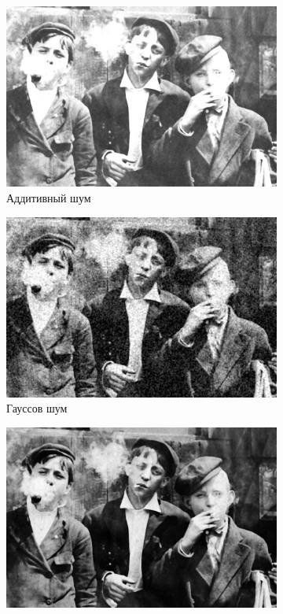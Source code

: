 \begin{figure}[ht!]
\begin{subfigure}[b]{0.5\linewidth}
      \includegraphics[width=0.95\linewidth]{../Rang_Filter/Rang_Additive_noise_(k=5,r=14).jpg} 
      \caption{Аддитивный шум} 
      \label{rang_5_14:c} 
      \vspace{4ex}
    \end{subfigure}%
    \begin{subfigure}[b]{0.5\linewidth}
      \centering
      \includegraphics[width=0.95\linewidth]{../Rang_Filter/Rang_Gaussian_noise_(k=5,r=14).jpg} 
      \caption{Гауссов шум} 
      \label{rang_5_14:d} 
      \vspace{4ex}
    \end{subfigure}
    \begin{subfigure}[b]{0.5\linewidth}
      \centering
      \includegraphics[width=0.95\linewidth]{../Rang_Filter/Rang_Poisson_noise_(k=5,r=14).jpg} 

\end{subfigure}
\end{figure}
